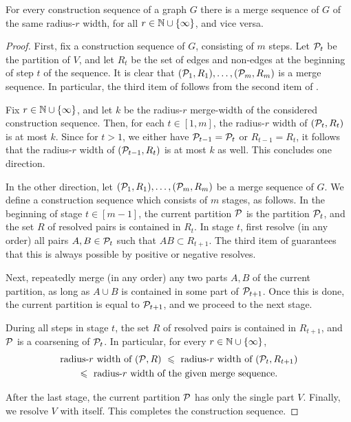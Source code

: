 \begin{lemma}\label{lem:fmw}
    For every construction sequence of a graph $G$ there is a merge sequence of $G$
  of the same radius-$r$ width, for all $r\in\N\cup\set\infty$,
  and vice versa.
  \end{lemma}
  \begin{proof}
  
  First, fix a construction sequence of $G$, consisting of $m$ steps. 
    Let $\cal P_t$ be the partition of $V$,
    and let $R_t$ be the set of edges and non-edges 
    at the beginning of step $t$ of the sequence.
    It is clear that 
    $(\cal P_1,R_1),\ldots,(\cal P_m,R_m)$ is a merge sequence. 
    In particular, the third item of  follows from the second item of .
    
    Fix $r\in\N\cup\set{\infty}$, and let $k$ 
    be the radius-$r$ merge-width of the considered construction sequence.
    Then, for each $t\in[1,m]$, 
    the radius-$r$ width of $(\cal P_t,R_t)$ is at most $k$.
    Since for $t>1$, we either have $\cal P_{t-1}=\cal P_t$ or $R_{t-1}=R_t$, it follows that 
    the radius-$r$ width of $(\cal P_{t-1},R_t)$ is at most $k$ as well.
    This concludes one direction.
  
  
  \medskip
  
  In the other direction,  
  let $(\cal P_1,R_1),\ldots,(\cal P_m,R_m)$ be a merge sequence of $G$.
  We define a construction sequence which consists of $m$ stages, as follows.
  In the beginning of stage $t\in[m-1]$,
  the current partition $\cal P$ is the partition $\cal P_t$, and the set $R$ of resolved pairs is contained in $R_t$.
  In stage $t$, first resolve (in any order) all pairs 
  $A,B\in\cal P_{t}$ such that $AB\subset R_{t+1}$.
  The third item of  guarantees that this is always possible by positive or negative resolves.

  Next, repeatedly merge (in any order) any two parts $A,B$ of the current partition, as long as $A\cup B$ is contained in some part of $\cal P_{t+1}$.
  Once this is done, the current partition is equal to $\cal P_{t+1}$, and we proceed to the next stage.
  
  During all steps in stage $t$, the set $R$ of resolved pairs is contained in $R_{t+1}$, and $\cal P$ is a coarsening of $\cal P_t$. In particular, for every $r\in\N\cup\set{\infty}$,
  \begin{multline*}
\text{radius-$r$ width of $(\cal P,R)$}\ \le \ 
\text{radius-$r$ width of $(\cal P_t,R_{t+1})$} \\
\le \ \text{radius-$r$ width of the given merge sequence}.
  \end{multline*}
 
  After the last stage, the current partition $\cal P$ has only the single part $V$. 
  Finally, we resolve $V$ with itself. This completes the  construction sequence.
  \end{proof}



